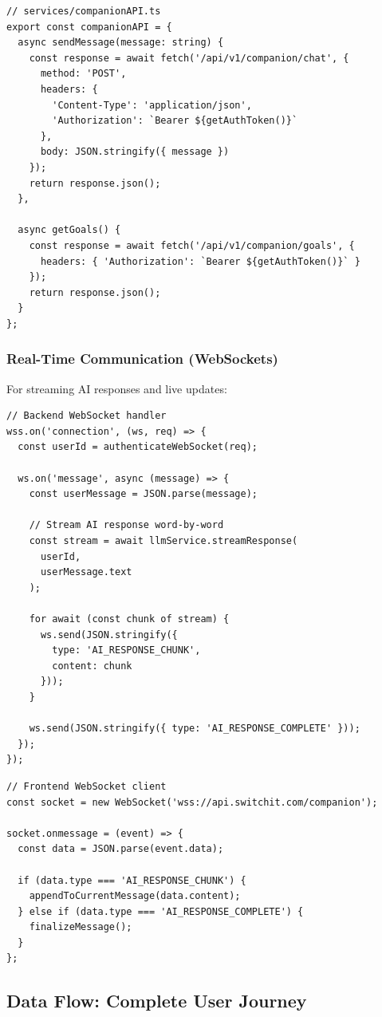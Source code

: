 \documentclass[12pt,a4paper]{article}
\begin{document}
\begin{verbatim}
// services/companionAPI.ts
export const companionAPI = {
  async sendMessage(message: string) {
    const response = await fetch('/api/v1/companion/chat', {
      method: 'POST',
      headers: {
        'Content-Type': 'application/json',
        'Authorization': `Bearer ${getAuthToken()}`
      },
      body: JSON.stringify({ message })
    });
    return response.json();
  },
  
  async getGoals() {
    const response = await fetch('/api/v1/companion/goals', {
      headers: { 'Authorization': `Bearer ${getAuthToken()}` }
    });
    return response.json();
  }
};
\end{verbatim}

\subsubsection{Real-Time Communication (WebSockets)}

For streaming AI responses and live updates:

\begin{verbatim}
// Backend WebSocket handler
wss.on('connection', (ws, req) => {
  const userId = authenticateWebSocket(req);
  
  ws.on('message', async (message) => {
    const userMessage = JSON.parse(message);
    
    // Stream AI response word-by-word
    const stream = await llmService.streamResponse(
      userId, 
      userMessage.text
    );
    
    for await (const chunk of stream) {
      ws.send(JSON.stringify({
        type: 'AI_RESPONSE_CHUNK',
        content: chunk
      }));
    }
    
    ws.send(JSON.stringify({ type: 'AI_RESPONSE_COMPLETE' }));
  });
});
\end{verbatim}

\begin{verbatim}
// Frontend WebSocket client
const socket = new WebSocket('wss://api.switchit.com/companion');

socket.onmessage = (event) => {
  const data = JSON.parse(event.data);
  
  if (data.type === 'AI_RESPONSE_CHUNK') {
    appendToCurrentMessage(data.content);
  } else if (data.type === 'AI_RESPONSE_COMPLETE') {
    finalizeMessage();
  }
};
\end{verbatim}

\subsection{Data Flow: Complete User Journey}
\end{document}
